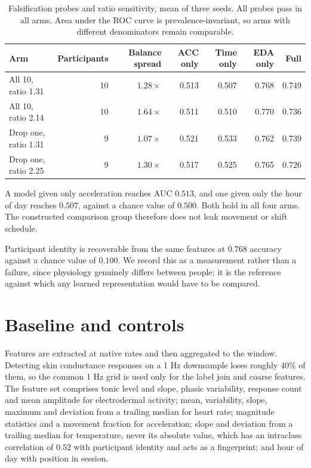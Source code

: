 \documentclass{article}
\begin{document}
\begin{table}[t]
\caption{Falsification probes and ratio sensitivity, mean of three seeds. All
probes pass in all arms. Area under the ROC curve is prevalence-invariant, so
arms with different denominators remain comparable.}
\label{tab:sens}
\centering
\begin{tabular}{lrrrrrr}
\toprule
Arm & Participants & Balance spread & ACC only & Time only & EDA only & Full \\
\midrule
All 10, ratio 1.31   & 10 & $1.28\times$ & 0.513 & 0.507 & 0.768 & 0.749 \\
All 10, ratio 2.14   & 10 & $1.64\times$ & 0.511 & 0.510 & 0.770 & 0.736 \\
Drop one, ratio 1.31 &  9 & $1.07\times$ & 0.521 & 0.533 & 0.762 & 0.739 \\
Drop one, ratio 2.25 &  9 & $1.30\times$ & 0.517 & 0.525 & 0.765 & 0.726 \\
\bottomrule
\end{tabular}
\end{table}

A model given only acceleration reaches AUC $0.513$, and one given only the
hour of day reaches $0.507$, against a chance value of $0.500$. Both hold in
all four arms. The constructed comparison group therefore does not leak
movement or shift schedule.

Participant identity is recoverable from the same features at $0.768$ accuracy
against a chance value of $0.100$. We record this as a measurement rather than
a failure, since physiology genuinely differs between people; it is the
reference against which any learned representation would have to be compared.

\section{Baseline and controls}
\label{sec:baseline}

Features are extracted at native rates and then aggregated to the window.
Detecting skin conductance responses on a 1 Hz downsample loses
roughly 40\% of them, so the common 1 Hz grid is used
only for the label join and coarse features. The feature set comprises tonic
level and slope, phasic variability, response count and mean amplitude for
electrodermal activity; mean, variability, slope, maximum and deviation from a
trailing median for heart rate; magnitude statistics and a movement fraction
for acceleration; slope and deviation from a trailing median for temperature,
never its absolute value, which has an intraclass correlation of $0.52$ with
participant identity and acts as a fingerprint; and hour of day with position
in session.
\end{document}
